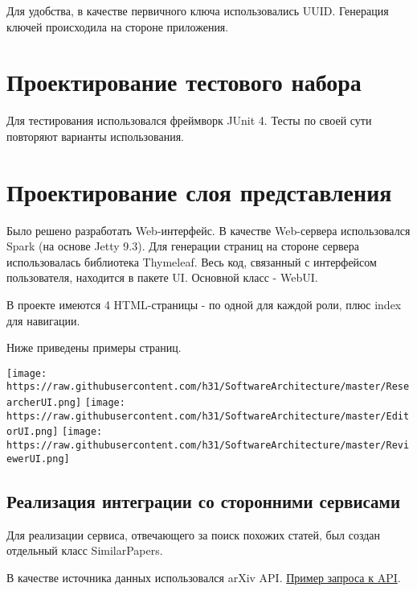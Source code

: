 Для удобства, в качестве первичного ключа использовались UUID. Генерация
ключей происходила на стороне приложения.

\section{Проектирование тестового
набора}\label{ux43fux440ux43eux435ux43aux442ux438ux440ux43eux432ux430ux43dux438ux435-ux442ux435ux441ux442ux43eux432ux43eux433ux43e-ux43dux430ux431ux43eux440ux430}

Для тестирования использовался фреймворк JUnit 4. Тесты по своей сути
повторяют варианты использования.

\section{Проектирование слоя
представления}\label{ux43fux440ux43eux435ux43aux442ux438ux440ux43eux432ux430ux43dux438ux435-ux441ux43bux43eux44f-ux43fux440ux435ux434ux441ux442ux430ux432ux43bux435ux43dux438ux44f}

Было решено разработать Web-интерфейс. В качестве Web-сервера
использовался Spark (на основе Jetty 9.3). Для генерации страниц на
стороне сервера использовалась библиотека Thymeleaf. Весь код, связанный
с интерфейсом пользователя, находится в пакете UI. Основной класс -
WebUI.

В проекте имеются 4 HTML-страницы - по одной для каждой роли, плюс index
для навигации.

Ниже приведены примеры страниц.

\texttt{[image: https://raw.githubusercontent.com/h31/SoftwareArchitecture/master/ResearcherUI.png]}
\texttt{[image: https://raw.githubusercontent.com/h31/SoftwareArchitecture/master/EditorUI.png]}
\texttt{[image: https://raw.githubusercontent.com/h31/SoftwareArchitecture/master/ReviewerUI.png]}

\subsection{Реализация интеграции со сторонними
сервисами}\label{ux440ux435ux430ux43bux438ux437ux430ux446ux438ux44f-ux438ux43dux442ux435ux433ux440ux430ux446ux438ux438-ux441ux43e-ux441ux442ux43eux440ux43eux43dux43dux438ux43cux438-ux441ux435ux440ux432ux438ux441ux430ux43cux438}

Для реализации сервиса, отвечающего за поиск похожих статей, был создан
отдельный класс SimilarPapers.

В качестве источника данных использовался arXiv API.
\href{http://export.arxiv.org/api/query?search_query=cats\&start=0\&max_results=5}{Пример
запроса к API}.

